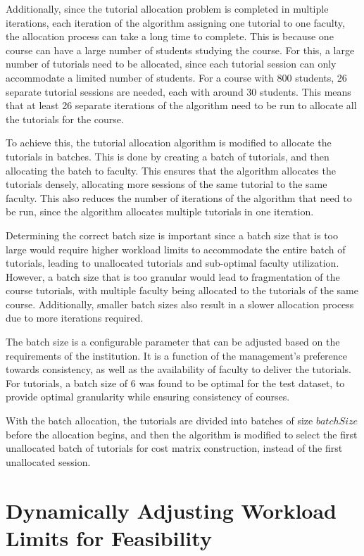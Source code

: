 Additionally, since the tutorial allocation problem is completed in multiple iterations, each iteration of the algorithm assigning one tutorial to one faculty, the allocation process can take a long time to complete. This is because one course can have a large number of students studying the course. For this, a large number of tutorials need to be allocated, since each tutorial session can only accommodate a limited number of students. For a course with 800 students, 26 separate tutorial sessions are needed, each with around 30 students. This means that at least 26 separate iterations of the algorithm need to be run to allocate all the tutorials for the course.

To achieve this, the tutorial allocation algorithm is modified to allocate the tutorials in batches. This is done by creating a batch of tutorials, and then allocating the batch to faculty. This ensures that the algorithm allocates the tutorials densely, allocating more sessions of the same tutorial to the same faculty. This also reduces the number of iterations of the algorithm that need to be run, since the algorithm allocates multiple tutorials in one iteration.

Determining the correct batch size is important since a batch size that is too large would require higher workload limits to accommodate the entire batch of tutorials, leading to unallocated tutorials and sub-optimal faculty utilization. However, a batch size that is too granular would lead to fragmentation of the course tutorials, with multiple faculty being allocated to the tutorials of the same course. Additionally, smaller batch sizes also result in a slower allocation process due to more iterations required.

The batch size is a configurable parameter that can be adjusted based on the requirements of the institution. It is a function of the management's preference towards consistency, as well as the availability of faculty to deliver the tutorials. For tutorials, a batch size of 6 was found to be optimal for the test dataset, to provide optimal granularity while ensuring consistency of courses.

With the batch allocation, the tutorials are divided into batches of size $batchSize$ before the allocation begins, and then the algorithm is modified to select the first unallocated batch of tutorials for cost matrix construction, instead of the first unallocated session.


\section{Dynamically Adjusting Workload Limits for Feasibility}

